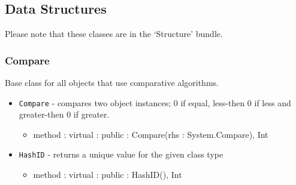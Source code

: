 \documentclass[12pt]{article}
\begin{document}
\subsection{Data Structures}
Please note that these classes are in the `Structure' bundle.
\subsubsection{Compare}
Base class for all objects that use comparative algorithms.
\begin{itemize}
\item \texttt{Compare} - compares two object instances; 0 if equal, less-then 0 if less and greater-then 0 if greater. 
  \begin{itemize}
  \item method : virtual : public : Compare(rhs : System.Compare), Int
  \end{itemize}
\item \texttt{HashID} - returns a unique value for the given class type
  \begin{itemize}
  \item method : virtual : public : HashID(), Int
  \end{itemize}	
\end{itemize}
\end{document}
